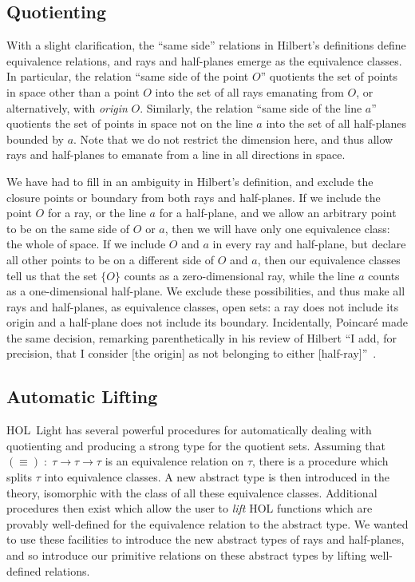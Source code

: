 \subsection{Quotienting}\label{sec:RayQuotienting}
With a slight clarification, the ``same side'' relations in Hilbert's definitions define equivalence relations, and rays and half-planes emerge as the equivalence classes. In particular, the relation ``same side of the point $O$'' quotients the set of points in space other than a point $O$ into the set of all rays emanating from $O$, or alternatively, with \emph{origin} $O$. Similarly, the relation ``same side of the line $a$'' quotients the set of points in space not on the line $a$ into the set of all half-planes bounded by $a$. Note that we do not restrict the dimension here, and thus allow rays and half-planes to emanate from a line in all directions in space. 

We have had to fill in an ambiguity in Hilbert's definition, and exclude the closure points or boundary from both rays and half-planes. If we include the point $O$ for a ray, or the line $a$ for a half-plane, and we allow an arbitrary point to be on the same side of $O$ or $a$, then we will have only one equivalence class: the whole of space. If we include $O$ and $a$ in every ray and half-plane, but declare all other points to be on a different side of $O$ and $a$, then our equivalence classes tell us that the set $\{O\}$ counts as a zero-dimensional ray, while the line $a$ counts as a one-dimensional half-plane. We exclude these possibilities, and thus make all rays and half-planes, as equivalence classes, open sets: a ray does not include its origin and a half-plane does not include its boundary. Incidentally, Poincar\'{e} made the same decision, remarking parenthetically in his review of Hilbert ``I add, for precision, that I consider [the origin] as not belonging to either [half-ray]''~\cite{PoincareReview}.

\subsection{Automatic Lifting}
HOL~Light has several powerful procedures for automatically dealing with quotienting and producing a strong type for the quotient sets. Assuming that $(\equiv)\;:\;\tau\rightarrow \tau \rightarrow \tau$ is an equivalence relation on $\tau$, there is a procedure which splits $\tau$ into equivalence classes. A new abstract type is then introduced in the theory, isomorphic with the class of all these equivalence classes. Additional procedures then exist which allow the user to \emph{lift} HOL functions which are provably well-defined for the equivalence relation to the abstract type. We wanted to use these facilities to introduce the new abstract types of rays and half-planes, and so introduce our primitive relations on these abstract types by lifting well-defined relations. 

